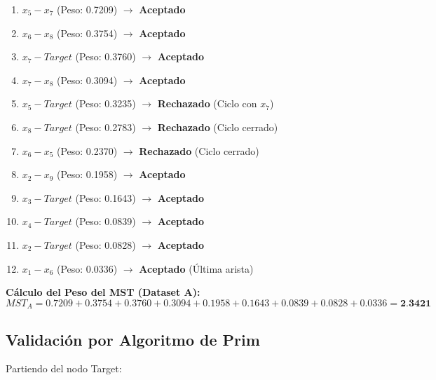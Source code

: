 \documentclass[12pt,a4paper]{article}
\begin{document}
\begin{enumerate}[label=\textbf{\arabic*.}]
    \item $x_5 - x_7$ (Peso: 0.7209) $\rightarrow$ \textbf{Aceptado}
    \item $x_6 - x_8$ (Peso: 0.3754) $\rightarrow$ \textbf{Aceptado}
    \item $x_7 - Target$ (Peso: 0.3760) $\rightarrow$ \textbf{Aceptado}
    \item $x_7 - x_8$ (Peso: 0.3094) $\rightarrow$ \textbf{Aceptado}
    \item $x_5 - Target$ (Peso: 0.3235) $\rightarrow$ \textbf{Rechazado} (Ciclo con $x_7$)
    \item $x_8 - Target$ (Peso: 0.2783) $\rightarrow$ \textbf{Rechazado} (Ciclo cerrado)
    \item $x_6 - x_5$ (Peso: 0.2370) $\rightarrow$ \textbf{Rechazado} (Ciclo cerrado)
    \item $x_2 - x_9$ (Peso: 0.1958) $\rightarrow$ \textbf{Aceptado}
    \item $x_3 - Target$ (Peso: 0.1643) $\rightarrow$ \textbf{Aceptado}
    \item $x_4 - Target$ (Peso: 0.0839) $\rightarrow$ \textbf{Aceptado}
    \item $x_2 - Target$ (Peso: 0.0828) $\rightarrow$ \textbf{Aceptado}
    \item $x_1 - x_6$ (Peso: 0.0336) $\rightarrow$ \textbf{Aceptado} (Última arista)
\end{enumerate}

\textbf{Cálculo del Peso del MST (Dataset A):}
\begin{equation}
    MST_A = 0.7209 + 0.3754 + 0.3760 + 0.3094 + 0.1958 + 0.1643 + 0.0839 + 0.0828 + 0.0336 = \textbf{2.3421}
\end{equation}

\subsection{Validación por Algoritmo de Prim}
Partiendo del nodo Target:
\end{document}
